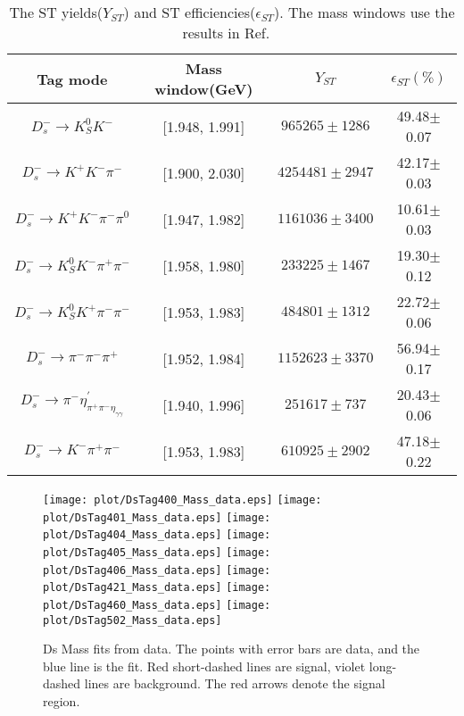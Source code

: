 \begin{table}
    \caption{ The ST yields($Y_{ST}$) and ST efficiencies($\epsilon_{ST}$). The mass windows use the results in Ref. ~\cite{Doc-DB-630-v35} }
    \label{ST-eff}
    \begin{center}
        \begin{tabular}{cccc}
            \toprule\toprule
            Tag mode & Mass window(GeV)  & $Y_{ST}$  & $\epsilon_{ST}(\%)$\\
            \hline
            $D_{s}^{-} \rightarrow K_{S}^{0}K^{-}$                          & [1.948, 1.991]    & $965265\pm1286$               & 49.48$\pm$0.07\\
            $D_{s}^{-} \rightarrow K^{+}K^{-}\pi^{-}$                       & [1.900, 2.030]    & $4254481\pm2947$              & 42.17$\pm$0.03\\
            $D_{s}^{-} \rightarrow K^{+}K^{-}\pi^{-}\pi^{0}$                & [1.947, 1.982]    & $1161036\pm3400$              & 10.61$\pm$0.03\\
            $D_{s}^{-} \rightarrow K_{S}^{0}K^{-}\pi^{+}\pi^{-}$            & [1.958, 1.980]    & $233225\pm1467$               & 19.30$\pm$0.12\\
            $D_{s}^{-} \rightarrow K_{S}^{0}K^{+}\pi^{-}\pi^{-}$            & [1.953, 1.983]    & $484801\pm1312$               & 22.72$\pm$0.06\\
            $D_{s}^{-} \rightarrow \pi^{-}\pi^{-}\pi^{+}$                   & [1.952, 1.984]    & $1152623\pm3370$              & 56.94$\pm$0.17\\
            $D_{s}^{-} \rightarrow \pi^{-}\eta_{\pi^{+}\pi^{-}\eta_{\gamma\gamma}}^{'}$          & [1.940, 1.996]    & $251617\pm737$               & 20.43$\pm$0.06\\
            $D_{s}^{-} \rightarrow K^{-}\pi^{+}\pi^{-}$                     & [1.953, 1.983]    & $610925\pm2902$               & 47.18$\pm$0.22\\
            \bottomrule\bottomrule
        \end{tabular}
    \end{center}
\end{table}

\begin{figure*}[!htbp]
 \centering
 \texttt{[image: plot/DsTag400\_Mass\_data.eps]}
 \texttt{[image: plot/DsTag401\_Mass\_data.eps]}
 \texttt{[image: plot/DsTag404\_Mass\_data.eps]}
 \texttt{[image: plot/DsTag405\_Mass\_data.eps]}
 \texttt{[image: plot/DsTag406\_Mass\_data.eps]}
 \texttt{[image: plot/DsTag421\_Mass\_data.eps]}
 \texttt{[image: plot/DsTag460\_Mass\_data.eps]}
 \texttt{[image: plot/DsTag502\_Mass\_data.eps]}
 \caption{Ds Mass fits from data. The points with error bars are data, and the blue line is the fit. Red short-dashed lines are signal, violet long-dashed lines are background. The red arrows denote the signal region.  }
\label{SingleTagFit}
\end{figure*}


